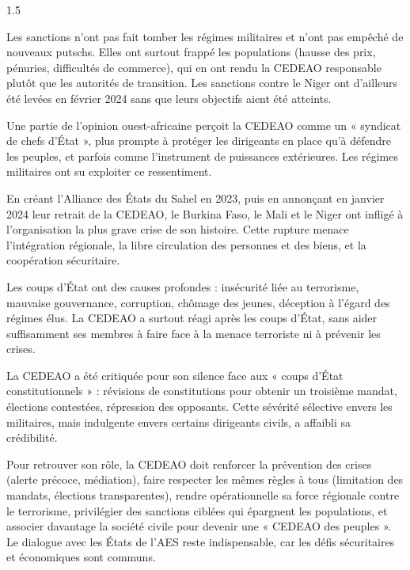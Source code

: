 \documentclass[12pt]{article}
\begin{document}
\begin{spacing}{1.5}

Les sanctions n'ont pas fait tomber les régimes militaires et n'ont pas empêché de nouveaux putschs. Elles ont surtout frappé les populations (hausse des prix, pénuries, difficultés de commerce), qui en ont rendu la CEDEAO responsable plutôt que les autorités de transition. Les sanctions contre le Niger ont d'ailleurs été levées en février 2024 sans que leurs objectifs aient été atteints.

Une partie de l'opinion ouest-africaine perçoit la CEDEAO comme un « syndicat de chefs d'État », plus prompte à protéger les dirigeants en place qu'à défendre les peuples, et parfois comme l'instrument de puissances extérieures. Les régimes militaires ont su exploiter ce ressentiment.

En créant l'Alliance des États du Sahel en 2023, puis en annonçant en janvier 2024 leur retrait de la CEDEAO, le Burkina Faso, le Mali et le Niger ont infligé à l'organisation la plus grave crise de son histoire. Cette rupture menace l'intégration régionale, la libre circulation des personnes et des biens, et la coopération sécuritaire.



Les coups d'État ont des causes profondes : insécurité liée au terrorisme, mauvaise gouvernance, corruption, chômage des jeunes, déception à l'égard des régimes élus. La CEDEAO a surtout réagi après les coups d'État, sans aider suffisamment ses membres à faire face à la menace terroriste ni à prévenir les crises.

La CEDEAO a été critiquée pour son silence face aux « coups d'État constitutionnels » : révisions de constitutions pour obtenir un troisième mandat, élections contestées, répression des opposants. Cette sévérité sélective envers les militaires, mais indulgente envers certains dirigeants civils, a affaibli sa crédibilité.

Pour retrouver son rôle, la CEDEAO doit renforcer la prévention des crises (alerte précoce, médiation), faire respecter les mêmes règles à tous (limitation des mandats, élections transparentes), rendre opérationnelle sa force régionale contre le terrorisme, privilégier des sanctions ciblées qui épargnent les populations, et associer davantage la société civile pour devenir une « CEDEAO des peuples ». Le dialogue avec les États de l'AES reste indispensable, car les défis sécuritaires et économiques sont communs.


\end{spacing}
\end{document}
